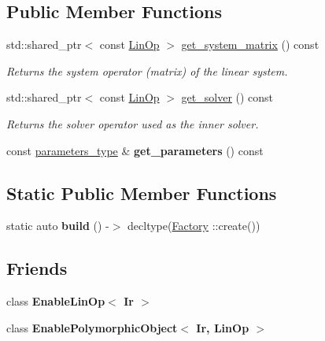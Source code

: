 \subsection*{Public Member Functions}
\begin{DoxyCompactItemize}
\item 
std\+::shared\+\_\+ptr$<$ const \hyperlink{classgko_1_1LinOp}{Lin\+Op} $>$ \hyperlink{classgko_1_1solver_1_1Ir_a2095b57bb8d3c31e0cfe395c911dbf84}{get\+\_\+system\+\_\+matrix} () const
\begin{DoxyCompactList}\small\item\em Returns the system operator (matrix) of the linear system. \end{DoxyCompactList}\item 
std\+::shared\+\_\+ptr$<$ const \hyperlink{classgko_1_1LinOp}{Lin\+Op} $>$ \hyperlink{classgko_1_1solver_1_1Ir_a3996838d5c38740a9777b522317ce3f1}{get\+\_\+solver} () const
\begin{DoxyCompactList}\small\item\em Returns the solver operator used as the inner solver. \end{DoxyCompactList}\item 
\mbox{\label{classgko_1_1solver_1_1Ir_a3bfeb9b57cea666c5fef55c10b27d897}} 
const \hyperlink{structgko_1_1solver_1_1Ir_1_1parameters__type}{parameters\+\_\+type} \& {\bfseries get\+\_\+parameters} () const
\end{DoxyCompactItemize}
\subsection*{Static Public Member Functions}
\begin{DoxyCompactItemize}
\item 
\mbox{\label{classgko_1_1solver_1_1Ir_aa4956697bd7c1de5a03b684554813568}} 
static auto {\bfseries build} () -\/$>$ decltype(\hyperlink{classgko_1_1solver_1_1Ir_1_1Factory}{Factory} \+::create())
\end{DoxyCompactItemize}
\subsection*{Friends}
\begin{DoxyCompactItemize}
\item 
\mbox{\label{classgko_1_1solver_1_1Ir_ac093132f180b389cafe5a3694d819dbd}} 
class {\bfseries Enable\+Lin\+Op$<$ Ir $>$}
\item 
\mbox{\label{classgko_1_1solver_1_1Ir_a775344ad65e9b035bfe6b4bb2cf99ce3}} 
class {\bfseries Enable\+Polymorphic\+Object$<$ Ir, Lin\+Op $>$}
\end{DoxyCompactItemize}


